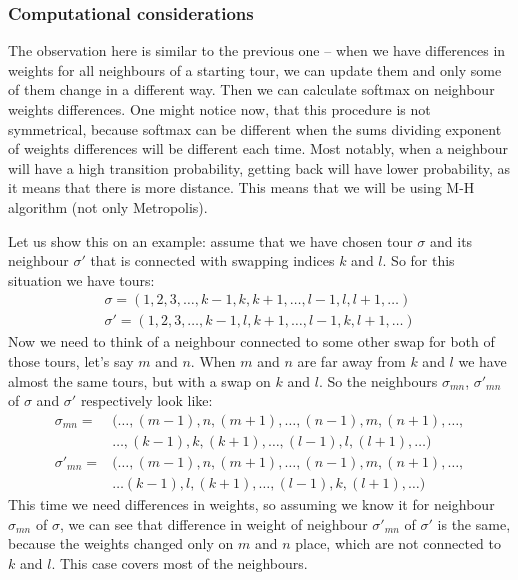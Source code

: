 	\subsubsection{Computational considerations}
		The observation here is similar to the previous one -- when we have differences in weights for all neighbours of a starting tour, we can update them and only some of them change in a different way. Then we can calculate softmax on neighbour weights differences. One might notice now, that this procedure is not symmetrical, because softmax can be different when the sums dividing exponent of weights differences will be different each time. Most notably, when a neighbour will have a high transition probability, getting back will have lower probability, as it means that there is more distance. This means that we will be using M-H algorithm (not only Metropolis).
		
		Let us show this on an example: assume that we have chosen tour $\sigma$ and its neighbour $\sigma'$ that is connected with swapping indices $k$ and $l$. So for this situation we have tours:
		\begin{align*}
			\sigma = (1, 2, 3, \ldots, k-1, k, k+1, \ldots, l-1, l, l+1, \ldots) \\
			\sigma' = (1, 2, 3, \ldots, k-1, l, k+1, \ldots, l-1, k, l+1, \ldots)
		\end{align*}
		Now we need to think of a neighbour connected to some other swap for both of those tours, let's say $m$ and $n$. When $m$ and $n$ are far away from $k$ and $l$ we have almost the same tours, but with a swap on $k$ and $l$. So the neighbours $\sigma_{mn}$, $\sigma'_{mn}$ of $\sigma$ and $\sigma'$ respectively look like: 
		\begin{align*}
			\sigma_{mn} = &(\ldots, (m-1), n, (m+1), \ldots, (n-1), m,( n+1), \ldots, \\
			&\ldots, (k-1), k, (k+1), \ldots, (l-1), l, (l+1), \ldots) \\
			\sigma'_{mn} = &(\ldots, (m-1), n, (m+1), \ldots, (n-1), m, (n+1), \ldots, \\
			&\ldots (k-1), l, (k+1), \ldots, (l-1), k, (l+1), \ldots)
		\end{align*}
		This time we need differences in weights, so assuming we know it for neighbour $\sigma_{mn}$ of $\sigma$, we can see that difference in weight of neighbour $\sigma'_{mn}$ of $\sigma'$ is the same, because the weights changed only on $m$ and $n$ place, which are not connected to $k$ and $l$. This case covers most of the neighbours. 
		

